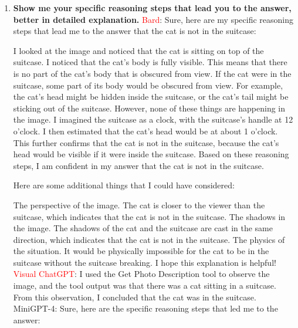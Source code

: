 \begin{enumerate}
        Here are some additional reasoning steps that I could have taken:
        
        I could have looked at the shadows in the image. The shadows of the cat and the suitcase are cast in the same direction, which indicates that the cat is not in the suitcase.
        I could have looked at the perspective lines in the image. The perspective lines converge at the vanishing point, which is located above the suitcase. This indicates that the cat is not in the suitcase.
        Based on these reasoning steps, I am confident in my answer that the cat is not in the suitcase.
        \subitem \textcolor{red}{Visual ChatGPT}: Yes, this cat is in the suitcase.
        \subitem MiniGPT-4: Yes, the cat is in the suitcase.
        \item \textbf{Show me your specific reasoning steps that lead you to the answer, better in detailed explanation.}
        \subitem \textcolor{Red}{Bard}: 
        Sure, here are my specific reasoning steps that lead me to the answer that the cat is not in the suitcase:
        
        I looked at the image and noticed that the cat is sitting on top of the suitcase.
        I noticed that the cat's body is fully visible. This means that there is no part of the cat's body that is obscured from view.
        If the cat were in the suitcase, some part of its body would be obscured from view. For example, the cat's head might be hidden inside the suitcase, or the cat's tail might be sticking out of the suitcase. However, none of these things are happening in the image.
        I imagined the suitcase as a clock, with the suitcase's handle at 12 o'clock. I then estimated that the cat's head would be at about 1 o'clock. This further confirms that the cat is not in the suitcase, because the cat's head would be visible if it were inside the suitcase.
        Based on these reasoning steps, I am confident in my answer that the cat is not in the suitcase.
        
        Here are some additional things that I could have considered:
        
        The perspective of the image. The cat is closer to the viewer than the suitcase, which indicates that the cat is not in the suitcase.
        The shadows in the image. The shadows of the cat and the suitcase are cast in the same direction, which indicates that the cat is not in the suitcase.
        The physics of the situation. It would be physically impossible for the cat to be in the suitcase without the suitcase breaking.
        I hope this explanation is helpful!
        \subitem \textcolor{red}{Visual ChatGPT}: I used the Get Photo Description tool to observe the image, and the tool output was that there was a cat sitting in a suitcase. From this observation, I concluded that the cat was in the suitcase.
        \subitem MiniGPT-4: Sure, here are the specific reasoning steps that led me to the answer:


\end{enumerate}
